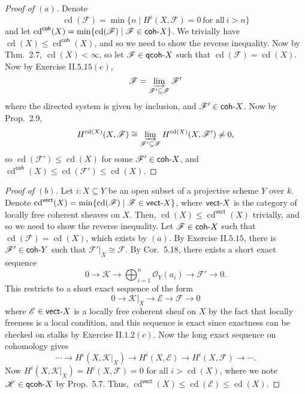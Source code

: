 \documentclass[10pt]{article}
\theoremstyle{definition}
\theoremstyle{remark}
\numberwithin{equation}{section}
\numberwithin{figure}{subsubsection}
\DeclareMathOperator{\cd}{cd}
\newcommand{\EE}{\mathscr{E}}
\newcommand{\FF}{\mathscr{F}}
\newcommand{\OO}{\mathcal{O}}
\newcommand{\qcoh}{\mathsf{qcoh}\mathchar`-}
\newcommand{\coh}{\mathsf{coh}\mathchar`-}
\newcommand{\vect}{\mathsf{vect}\mathchar`-}
\begin{document}
\begin{proof}[Proof of $(a)$]
  Denote
  \begin{equation*}
    \cd(\FF) = \min\{n \mid H^i(X,\FF) = 0\ \text{for all}\ i > n\}
  \end{equation*}
  and let $\cd^\mathsf{coh}(X) = \min\{\cd(\FF) \mid \FF \in \coh X\}$.
  We trivially have $\cd(X) \le \cd^\mathsf{coh}(X)$, and so we need to show the
  reverse inequality. Now by Thm.\ 2.7, $\cd(X) < \infty$, so let $\FF \in \qcoh
  X$ such that $\cd(\FF) = \cd(X)$. Now by Exercise II.$5.15(e)$,
  \begin{equation*}
    \FF = \varinjlim_{\FF' \subseteq \FF} \FF'
  \end{equation*}
  where the directed system is given by inclusion, and $\FF' \in \coh X$.
  Now by Prop.\ 2.9,
  \begin{equation*}
    H^{\cd(X)}(X,\FF) \cong \varinjlim_{\FF' \subseteq \FF} H^{\cd(X)}(X,\FF')
    \ne 0,
  \end{equation*}
  so $\cd(\FF') \le \cd(X)$ for some $\FF' \in \coh X$, and 
  $\cd^\mathsf{coh}(X) \le \cd(\FF') \le \cd(X)$.
\end{proof}
\begin{proof}[Proof of $(b)$]
  Let $i\colon X \subseteq Y$ be an open subset of a projective scheme
  $Y$ over $k$. Denote $\cd^\mathsf{vect}(X) = \min\{\cd(\FF) \mid \FF \in \vect
  X\}$, where $\vect X$ is the category of locally free coherent sheaves on $X$.
  Then, $\cd(X) \le \cd^\mathsf{vect}(X)$ trivially, and so we need to show the
  reverse inequality. Let $\FF \in \coh X$ such that $\cd(\FF) = \cd(X)$, which
  exists by $(a)$. By Exercise II.$5.15$, there is $\FF' \in \coh Y$ such that
  $\FF'\rvert_X \cong \FF$. By Cor.\ 5.18, there exists a short exact sequence
  \begin{equation*}
    0 \longrightarrow \mathscr{K} \longrightarrow \bigoplus_{i=1}^n \OO_Y(a_i)
    \longrightarrow \FF' \longrightarrow 0.
  \end{equation*}
  This restricts to a short exact sequence of the form
  \begin{equation*}
    0 \longrightarrow \mathscr{K}\rvert_X \longrightarrow \EE
    \longrightarrow \FF \longrightarrow 0
  \end{equation*}
  where $\EE \in \vect X$ is a locally free coherent sheaf on $X$ by the fact
  that locally freeness is a local condition, and this sequence is exact
  since exactness can be checked on stalks by Exercise II.$1.2(c)$. Now the long
  exact sequence on cohomology gives
  \begin{equation*}
    \cdots \longrightarrow H^i(X,\mathscr{K}\rvert_X) \longrightarrow
    H^i(X,\EE) \longrightarrow H^i(X,\FF) \longrightarrow
    \cdots.
  \end{equation*}
  Now $H^i(X,\mathscr{K}\rvert_X) = H^i(X,\FF) = 0$ for all $i > \cd(X)$, where
  we note $\mathscr{K} \in \qcoh X$ by Prop.\ 5.7. Thus,
  $\cd^\mathsf{vect}(X) \le \cd(\EE) \le \cd(X)$.
\end{proof}
\end{document}

